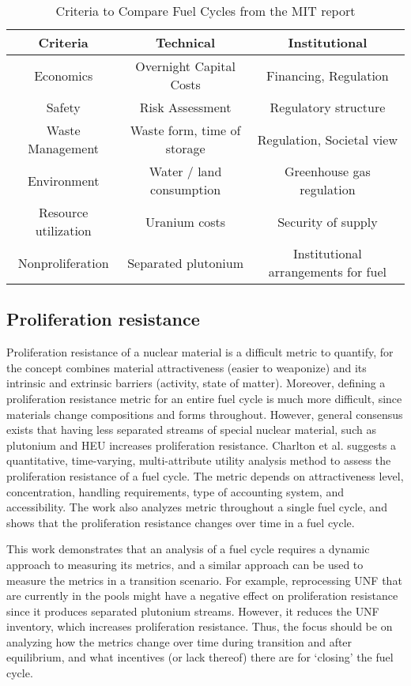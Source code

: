 \begin{table}[h]
    \centering
    \label{tab:mit}
    \caption{Criteria to Compare Fuel Cycles from the MIT report \cite{kazimi_future_2011}}
    \begin{tabular}{ccc}
        \hline
        \textbf{Criteria} & \textbf{Technical} & \textbf{Institutional}\\ \hline
        Economics & Overnight Capital Costs & Financing, Regulation \\
        Safety & Risk Assessment & Regulatory structure \\
        Waste Management & Waste form, time of storage & Regulation, Societal view \\
        Environment & Water / land consumption & Greenhouse gas regulation \\
        Resource utilization & Uranium costs & Security of supply \\
        Nonproliferation & Separated plutonium & Institutional arrangements for fuel \\
        \hline
    \end{tabular}
\end{table}


\subsection{Proliferation resistance}

Proliferation resistance of a nuclear material is a difficult
metric to quantify,
for the concept combines material attractiveness (easier to weaponize)
and its intrinsic and extrinsic barriers (activity, state of matter).
Moreover, defining a proliferation resistance metric for an
entire fuel cycle is much more difficult, since materials change
compositions and forms throughout. However, general consensus exists
that having less separated streams of special nuclear material, such
as plutonium and \gls{HEU} increases proliferation resistance.
Charlton et al. \cite{charlton_proliferation_2007} suggests a
quantitative, time-varying, multi-attribute utility analysis method
to assess the proliferation resistance of a fuel cycle. The metric
depends on attractiveness level, concentration, handling requirements,
type of accounting system, and accessibility. The work also analyzes
metric throughout a single fuel cycle, and shows that the proliferation
resistance changes over time in a fuel cycle.

This work demonstrates that an analysis of a fuel cycle requires
a dynamic approach to measuring its metrics, and a similar approach
can be used to measure the metrics in a transition scenario.
For example, reprocessing \gls{UNF} that are currently in the
pools might have a negative effect on proliferation resistance
since it produces separated plutonium streams. However, it reduces
the \gls{UNF} inventory, which increases proliferation resistance.
Thus, the focus should be on analyzing how the metrics change
over time during transition and after equilibrium, and what
incentives (or lack thereof) there are for `closing' the fuel cycle.

